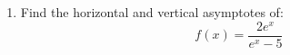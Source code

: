 \documentclass[12pt]{article}
\begin{document}
\begin{enumerate}
\begin{enumerate}
        \item Find the horizontal and vertical asymptotes of:
        \[
        f(x) = \frac{2e^x}{e^x - 5}
        \]
    \end{enumerate}
\end{enumerate}
\end{document}
